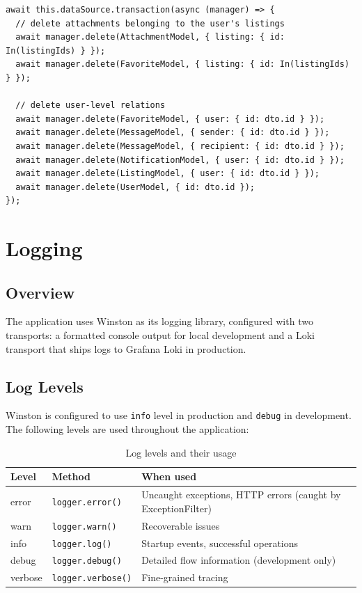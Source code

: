 \documentclass[12pt, a4paper]{article}
\begin{document}
\begin{lstlisting}[style=code, language={[Sharp]C}, caption=DeleteUserUseCase — cascading transactional delete]
await this.dataSource.transaction(async (manager) => {
  // delete attachments belonging to the user's listings
  await manager.delete(AttachmentModel, { listing: { id: In(listingIds) } });
  await manager.delete(FavoriteModel, { listing: { id: In(listingIds) } });

  // delete user-level relations
  await manager.delete(FavoriteModel, { user: { id: dto.id } });
  await manager.delete(MessageModel, { sender: { id: dto.id } });
  await manager.delete(MessageModel, { recipient: { id: dto.id } });
  await manager.delete(NotificationModel, { user: { id: dto.id } });
  await manager.delete(ListingModel, { user: { id: dto.id } });
  await manager.delete(UserModel, { id: dto.id });
});
\end{lstlisting}

\section{Logging}

\subsection{Overview}

The application uses Winston as its logging library, configured with two transports: a formatted console output for local development and a Loki transport that ships logs to Grafana Loki in production.

\subsection{Log Levels}

Winston is configured to use \texttt{info} level in production and \texttt{debug} in development. The following levels are used throughout the application:

\begin{table}[H]
    \centering
    \begin{tabular}{@{}lll@{}}
        \toprule
        \textbf{Level} & \textbf{Method} & \textbf{When used} \\
        \midrule
        error & \texttt{logger.error()} & Uncaught exceptions, HTTP errors (caught by ExceptionFilter) \\
        warn  & \texttt{logger.warn()}  & Recoverable issues \\
        info  & \texttt{logger.log()}   & Startup events, successful operations \\
        debug & \texttt{logger.debug()} & Detailed flow information (development only) \\
        verbose & \texttt{logger.verbose()} & Fine-grained tracing \\
        \bottomrule
    \end{tabular}
    \caption{Log levels and their usage}
\end{table}
\end{document}
